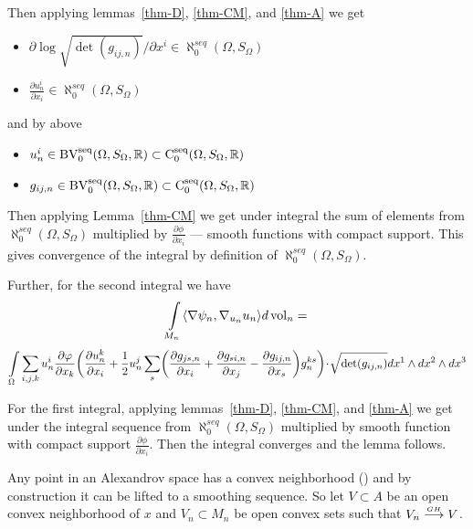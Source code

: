 Then applying lemmas~\ref{thm-D}, \ref{thm-CM}, and \ref{thm-A} we get

\begin{itemize}

\item $\partial \log \sqrt {\det (g_{ij,n})}/\partial x^i\in \aleph_0^{seq}(\Omega,S_\Omega)$

\item $\frac{\partial u_n^i}{\partial x_i}\in \aleph_0^{seq}(\Omega,S_\Omega)$
 
\end{itemize} 
 
 and by above
 
  \begin{itemize}
  
  \item ${u^i_n}\in  \operatorname{BV_0^{seq}}(\Omega,S_\Omega,\mathbb{R})\subset\operatorname{C_0^{seq}}(\Omega,S_\Omega,\mathbb{R})$ 
 
 \item $g_{i j,n}\in   \operatorname{BV_0^{seq}}(\Omega,S_\Omega,\mathbb{R})\subset \operatorname{C_0^{seq}}(\Omega,S_\Omega,\mathbb{R})$
 
  \end{itemize}
  
  Then applying Lemma~\ref{thm-CM}
  we get under integral the sum of elements from $\aleph_0^{seq}(\Omega,S_\Omega)$
  multiplied by $\frac{\partial \phi}{\partial x_i}$ --- smooth functions with compact support.
       This gives convergence of the integral by definition of  $\aleph_0^{seq}(\Omega,S_\Omega)$.
              

Further, for the second integral %
we have
$$\int\limits_{M_n}\langle\nabla\psi_n,\nabla_{u_n} u_n\rangle d\operatorname{vol}_n=$$
 $$\int\limits_{\Omega}  \sum_{i,j,k}u^i_n \frac{\partial \phi}{\partial x_k}
 \biggl(\frac{\partial u^k_n}{\partial x_i} +\frac{1}{2}u^j_n\sum_s
 \biggl(\frac{\partial g_{ js,n}}{\partial x_i}+\frac{\partial g_{si,n}}{\partial x_j}-\frac{\partial g_{i j,n}}{\partial x_s}\biggr) g^{ks}_n\biggr)\cdot \sqrt{\op{det}(g_{i j,n})}dx^1\wedge dx^2\wedge dx^3$$ 
 
For the first integral,
 applying
lemmas~\ref{thm-D}, \ref{thm-CM}, and \ref{thm-A} we get under the integral sequence from $\aleph_0^{seq}(\Omega,S_\Omega)$ multiplied by smooth function with compact support $\frac{\partial \phi}{\partial x_i}$. Then the integral converges and the lemma follows.
\qeds


Any point  in an Alexandrov space
has a convex neighborhood (\cite{convexity}) and by
construction  it can be lifted  to a smoothing sequence.
So let 
$V\subset A$ be an open  convex
neighborhood of $x$ and
$ V_n\subset M_n$
be open convex sets such that
$V_n  \stackrel{\hbox{\tiny $GH$}}{\longrightarrow}   V$.

